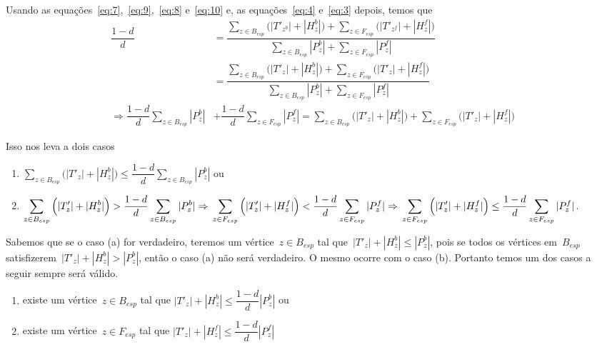 	Usando as equações~\ref{eq:7},~\ref{eq:9},~\ref{eq:8} e~\ref{eq:10}
	e, as equações~\ref{eq:4} e~\ref{eq:3} depois, temos que
	\begin{align}
		\dfrac{1-d}{d} &= 
		\dfrac{
			\displaystyle\sum_{z\in B_{esp}}
			\Big(|T'_{z^b}|+|H_z^b|\Big) + 
			\displaystyle\sum_{z\in F_{esp}}
			\Big(|T'_{z^f}|+|H_z^f|\Big)}
			{\displaystyle\sum_{z\in B_{esp}}|P_z^b| +
			\displaystyle\sum_{z\in F_{esp}}|P_z^f|}
			\nonumber\\
		&= \dfrac{
			\displaystyle\sum_{z\in B_{esp}}
			\Big(|T'_{z}|+|H_z^b|\Big) + 
			\displaystyle\sum_{z\in F_{esp}}
			\Big(|T'_{z}|+|H_z^f|\Big)}
			{\displaystyle\sum_{z\in B_{esp}}|P_z^b| +
			\displaystyle\sum_{z\in F_{esp}}|P_z^f|}
			\nonumber \\
			\Rightarrow	
			\dfrac{1-d}{d}\displaystyle\sum_{z\in B_{esp}}|P_z^b| &+ 
			\dfrac{1-d}{d}\displaystyle\sum_{z\in F_{esp}}|P_z^f|
			= \displaystyle\sum_{z\in B_{esp}}
			\Big(|T'_{z}|+|H_z^b|\Big) + 
			\displaystyle\sum_{z\in F_{esp}}
			\Big(|T'_{z}|+|H_z^f|\Big)\nonumber
	\end{align}

	\newpage

	Isso nos leva a dois casos
	\begin{enumerate}[label=(\alph*)]
		\item $\displaystyle\sum_{z\in B_{esp}}
			\Big(|T'_{z}|+|H_z^b|\Big)\le
			\dfrac{1-d}{d}\displaystyle\sum_{z\in B_{esp}}|P_z^b|$
			ou
		\item $\displaystyle\sum_{z\in B_{esp}}
			\Big(|T'_{z}|+|H_z^b|\Big)>
			\dfrac{1-d}{d}\displaystyle\sum_{z\in B_{esp}}|P_z^b|
			\Rightarrow \\
			\displaystyle\sum_{z\in F_{esp}}
			\Big(|T'_{z}|+|H_z^f|\Big)<
			\dfrac{1-d}{d}\displaystyle\sum_{z\in F_{esp}}|P_z^f|
			\Rightarrow \\
			\displaystyle\sum_{z\in F_{esp}}
			\Big(|T'_{z}|+|H_z^f|\Big)\le
			\dfrac{1-d}{d}\displaystyle\sum_{z\in F_{esp}}|P_z^f|$.
	\end{enumerate}

	Sabemos que se o caso (a) for verdadeiro, teremos um 
	vértice~$z\in B_{esp}$ tal que~${|T'_z|+|H^b_z|\le |P^b_z|}$,
	pois se todos os vértices em~$B_{esp}$ 
	satisfizerem~${|T'_z|+|H^b_z| > |P^b_z|}$, então o caso (a)
	não será verdadeiro.
	O mesmo ocorre com o caso (b). 
	Portanto temos um dos casos
	a seguir sempre será válido.

	\begin{enumerate}[label=(\alph*)]
		\item existe um vértice~$z\in B_{esp}$ 
			tal que $|T'_{z}|+|H_z^b|\le
			\dfrac{1-d}{d}|P_z^b|$ ou
		\item existe um vértice~$z\in F_{esp}$ 
			tal que $|T'_{z}|+|H_z^f|\le
			\dfrac{1-d}{d}|P_z^f|$
	\end{enumerate}

